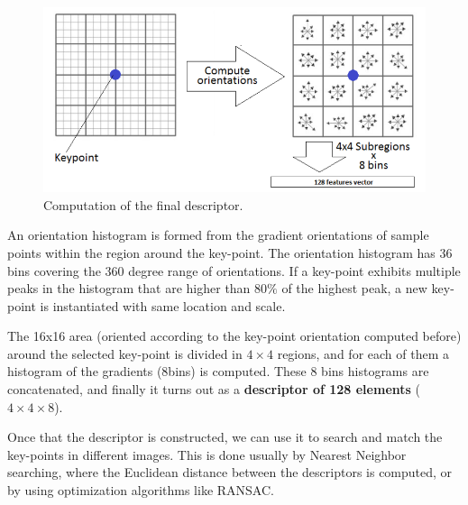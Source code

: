 \begin{figure}[H]
    \centering
    \includegraphics[scale=0.3]{Figures/decrs.png}
    \caption{Computation of the final descriptor.}
    \label{fig:decrs}
\end{figure}

An orientation histogram is formed from the gradient orientations of sample points within
the region around the key-point. The orientation histogram has 36 bins covering the 360 degree
range of orientations. If a key-point exhibits multiple peaks in the histogram that are higher than $80\%$ of the highest peak, a new key-point is instantiated with same location and scale.


The 16x16 area (oriented according to the key-point orientation computed before) around the selected key-point is divided in $4\times4$ regions, and for each of them a histogram of the gradients (8bins) is computed. These 8 bins histograms are concatenated, and finally it turns out as a \textbf{descriptor of 128 elements} ($4\times4\times8$).

Once that the descriptor is constructed, we can use it to search and match the key-points in different images. This is done usually by Nearest Neighbor searching, where the Euclidean distance between the descriptors is computed, or by using optimization algorithms like RANSAC. 